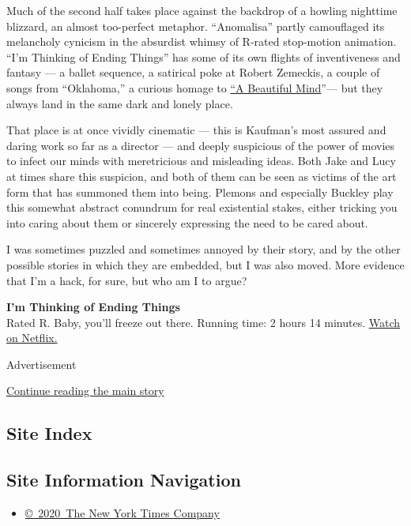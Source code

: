 Much of the second half takes place against the backdrop of a howling
nighttime blizzard, an almost too-perfect metaphor. ``Anomalisa'' partly
camouflaged its melancholy cynicism in the absurdist whimsy of R-rated
stop-motion animation. ``I'm Thinking of Ending Things'' has some of its
own flights of inventiveness and fantasy --- a ballet sequence, a
satirical poke at Robert Zemeckis, a couple of songs from ``Oklahoma,''
a curious homage to
\href{https://www.youtube.com/watch?v=H7Y_mHNgnpA}{``A Beautiful
Mind}''--- but they always land in the same dark and lonely place.

That place is at once vividly cinematic --- this is Kaufman's most
assured and daring work so far as a director --- and deeply suspicious
of the power of movies to infect our minds with meretricious and
misleading ideas. Both Jake and Lucy at times share this suspicion, and
both of them can be seen as victims of the art form that has summoned
them into being. Plemons and especially Buckley play this somewhat
abstract conundrum for real existential stakes, either tricking you into
caring about them or sincerely expressing the need to be cared about.

I was sometimes puzzled and sometimes annoyed by their story, and by the
other possible stories in which they are embedded, but I was also moved.
More evidence that I'm a hack, for sure, but who am I to argue?

\textbf{I'm Thinking of Ending Things}\\
Rated R. Baby, you'll freeze out there. Running time: 2 hours 14
minutes. \href{https://www.netflix.com/title/80211559}{Watch on
Netflix.}

Advertisement

\protect\hyperlink{after-bottom}{Continue reading the main story}

\hypertarget{site-index}{%
\subsection{Site Index}\label{site-index}}

\hypertarget{site-information-navigation}{%
\subsection{Site Information
Navigation}\label{site-information-navigation}}

\begin{itemize}
\tightlist
\item
  \href{https://help.nytimes3xbfgragh.onion/hc/en-us/articles/115014792127-Copyright-notice}{©~2020~The
  New York Times Company}
\end{itemize}

